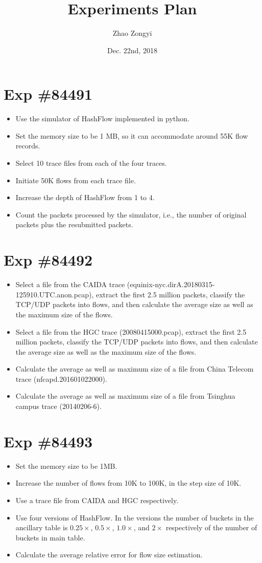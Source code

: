 \documentclass{article}
\title{Experiments Plan}
\author{Zhao Zongyi}
\date{Dec. 22nd, 2018}
\begin{document}
\maketitle
\section*{Exp \#84491}
\begin{itemize}
	\item Use the simulator of HashFlow implemented in python.
	\item Set the memory size to be 1 MB, so it can accommodate around 55K flow records.
	\item Select 10 trace files from each of the four traces.
	\item Initiate 50K flows from each trace file.
	\item Increase the depth of HashFlow from 1 to 4. 
	\item Count the packets processed by the simulator, i.e., the number of original packets plus the resubmitted packets.
\end{itemize}

\section*{Exp \#84492}
\begin{itemize}
	\item Select a file from the CAIDA trace (equinix-nyc.dirA.20180315-125910.UTC.anon.pcap), extract the first 2.5 million packets, classify the TCP/UDP packets into flows, and then calculate the average size as well as the maximum size of the flows.
	\item Select a file from the HGC trace (20080415000.pcap), extract the first 2.5 million packets, classify the TCP/UDP packets into flows, and then calculate the average size as well as the maximum size of the flows.
	\item Calculate the average as well as maximum size of a file from China Telecom trace (nfcapd.201601022000).
	\item Calculate the average as well as maximum size of a file from Tsinghua campus trace (20140206-6). 
\end{itemize}

\section*{Exp \#84493}
\begin{itemize}
	\item Set the memory size to be 1MB. 
	\item Increase the number of flows from 10K to 100K, in the step size of 10K.
	\item Use a trace file from CAIDA and HGC respectively.
	\item Use four versions of HashFlow. In the versions the number of buckets in the ancillary table is $0.25\times$, $0.5\times$, $1.0\times$, and $2\times$ respectively of the number of buckets in main table.
	\item Calculate the average relative error for flow size estimation.
\end{itemize}
\end{document}
